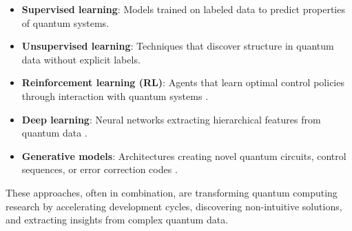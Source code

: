 \begin{itemize}
    \item \textbf{Supervised learning}: Models trained on labeled data to predict properties of quantum systems.
    \item \textbf{Unsupervised learning}: Techniques that discover structure in quantum data without explicit labels.
    \item \textbf{Reinforcement learning (RL)}: Agents that learn optimal control policies through interaction with quantum systems \cite{arulkumaran2017deep, shakya2023reinforcement}.
    \item \textbf{Deep learning}: Neural networks extracting hierarchical features from quantum data \cite{lecun2015deep}.
    \item \textbf{Generative models}: Architectures creating novel quantum circuits, control sequences, or error correction codes \cite{bernardo2007generative}.
\end{itemize}

These approaches, often in combination, are transforming quantum computing research by accelerating development cycles, discovering non-intuitive solutions, and extracting insights from complex quantum data. 